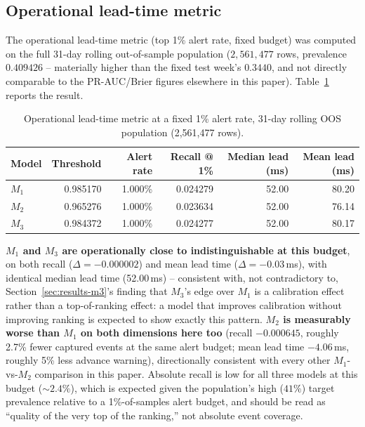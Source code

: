 \subsection{Operational lead-time metric}
\label{sec:results-operational}

The operational lead-time metric (top 1\% alert rate, fixed budget) was
computed on the full 31-day rolling out-of-sample population
($2{,}561{,}477$ rows, prevalence $0.409426$ -- materially higher than the
fixed test week's $0.3440$, and not directly comparable to the PR-AUC/Brier
figures elsewhere in this paper). Table~\ref{tab:operational} reports the
result.

\begin{table}[htbp]
\centering
\caption{Operational lead-time metric at a fixed 1\% alert rate, 31-day
rolling OOS population (2{,}561{,}477 rows).}
\label{tab:operational}
\begin{tabular}{@{}lrrrrr@{}}
\toprule
Model & Threshold & Alert rate & Recall @ 1\% & Median lead (ms) & Mean lead (ms) \\
\midrule
$M_1$ & 0.985170 & 1.000\% & 0.024279 & 52.00 & 80.20 \\
$M_2$ & 0.965276 & 1.000\% & 0.023634 & 52.00 & 76.14 \\
$M_3$ & 0.984372 & 1.000\% & 0.024277 & 52.00 & 80.17 \\
\bottomrule
\end{tabular}
\end{table}

\textbf{$M_1$ and $M_3$ are operationally close to indistinguishable at
this budget}, on both recall ($\Delta = -0.000002$) and mean lead time
($\Delta = -0.03$\,ms), with identical median lead time (52.00\,ms) --
consistent with, not contradictory to, Section~\ref{sec:results-m3}'s
finding that $M_3$'s edge over $M_1$ is a calibration effect rather than
a top-of-ranking effect: a model that improves calibration without
improving ranking is expected to show exactly this pattern. \textbf{$M_2$
is measurably worse than $M_1$ on both dimensions here too} (recall
$-0.000645$, roughly 2.7\% fewer captured events at the same alert
budget; mean lead time $-4.06$\,ms, roughly 5\% less advance warning),
directionally consistent with every other $M_1$-vs-$M_2$ comparison in
this paper. Absolute recall is low for all three models at this budget
($\sim 2.4\%$), which is expected given the population's high ($41\%$)
target prevalence relative to a 1\%-of-samples alert budget, and should
be read as ``quality of the very top of the ranking,'' not absolute event
coverage.
